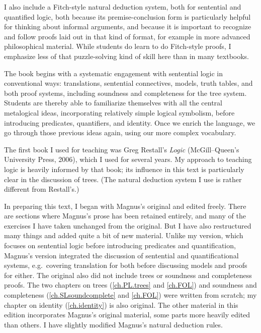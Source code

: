 I also include a Fitch-style natural deduction system, both for sentential and quantified logic, both because its premise-conclusion form is particularly helpful for thinking about informal arguments, and because it is important to recognize and follow proofs laid out in that kind of format, for example in more advanced philosophical material. While students do learn to do Fitch-style proofs, I emphasize less of that puzzle-solving kind of skill here than in many textbooks.

The book begins with a systematic engagement with sentential logic in conventional ways: translations, sentential connectives, models, truth tables, and both proof systems, including soundness and completeness for the tree system. Students are thereby able to familiarize themselves with all the central metalogical ideas, incorporating relatively simple logical symbolism, before introducing predicates, quantifiers, and identity. Once we enrich the language, we go through those previous ideas again, using our more complex vocabulary.

The first book I used for teaching was Greg Restall's \emph{Logic} (McGill--Queen's University Press, 2006), which I used for several years. My approach to teaching logic is heavily informed by that book; its influence in this text is particularly clear in the discussion of trees. (The natural deduction system I use is rather different from Restall's.)

In preparing this text, I began with Magnus's original and edited freely. There are sections where Magnus's prose has been retained entirely, and many of the exercises I have taken unchanged from the original. But I have also restructured many things and added quite a bit of new material. Unlike my version, which focuses on sentential logic before introducing predicates and quantification, Magnus's version integrated the discussion of sentential and quantificational systems, e.g.\ covering translation for both before discussing models and proofs for either. The original also did not include trees or soundness and completeness proofs. The two chapters on trees (\ref{ch.PL.trees} and \ref{ch.FOL}) and soundness and completeness (\ref{ch.SLsoundcomplete} and \ref{ch.FOL}) were written from scratch; my chapter on identity (\ref{ch.identity}) is also original. The other material in this edition incorporates Magnus's original material, some parts more heavily edited than others. I have slightly modified Magnus's natural deduction rules.

